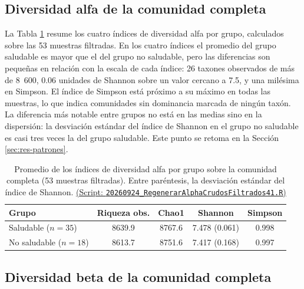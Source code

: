 \subsection{Diversidad alfa de la comunidad completa}

La Tabla \ref{tab:alfa-medias} resume los cuatro índices de diversidad alfa por grupo, calculados
sobre las 53 muestras filtradas. En los cuatro índices el promedio del grupo saludable es mayor que
el del grupo no saludable, pero las diferencias son pequeñas en relación con la escala de cada
índice: 26 taxones observados de más de 8~600, 0.06 unidades de Shannon sobre un valor cercano a
7.5, y una milésima en Simpson. El índice de Simpson está próximo a su máximo en todas las
muestras, lo que indica comunidades sin dominancia marcada de ningún taxón. La diferencia más
notable entre grupos no está en las medias sino en la dispersión: la desviación estándar del índice
de Shannon en el grupo no saludable es casi tres veces la del grupo saludable. Este punto se
retoma en la Sección \ref{sec:res-patrones}.

\begin{table}[H]
\centering
\caption{Promedio de los índices de diversidad alfa por grupo sobre la comunidad completa
(53 muestras filtradas). Entre paréntesis, la desviación estándar del índice de Shannon. \href{https://github.com/CamilaSilva1995/Tesis_Maestria/blob/main/Analisis_Comparativo/Fresa_Solena/20260924_RegenerarAlphaCrudosFiltrados41.R}{(Script: \texttt{20260924\_RegenerarAlphaCrudosFiltrados41.R})}}
\label{tab:alfa-medias}
\small
\setlength{\tabcolsep}{4pt}
\begin{tabular}{lcccc}
\hline
Grupo & Riqueza obs. & Chao1 & Shannon & Simpson \\
\hline
Saludable ($n = 35$)    & 8639.9 & 8767.6 & 7.478 (0.061) & 0.998 \\
No saludable ($n = 18$) & 8613.7 & 8751.6 & 7.417 (0.168) & 0.997 \\
\hline
\end{tabular}
\end{table}

\subsection{Diversidad beta de la comunidad completa}

